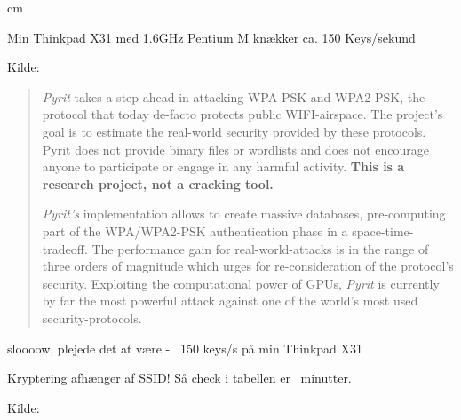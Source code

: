 \documentclass[Screen16to9,17pt]{foils}
\begin{document}
 cm

\centerline{Min Thinkpad X31 med 1.6GHz Pentium M knækker ca. 150 Keys/sekund}



Kilde: 


\begin{quote}
\emph{Pyrit} takes a step ahead in attacking WPA-PSK and WPA2-PSK, the protocol that today de-facto protects public WIFI-airspace. The project's goal is to estimate the real-world security provided by these protocols. Pyrit does not provide binary files or wordlists and does not encourage anyone to participate or engage in any harmful activity. {\bf This is a research project, not a cracking tool.}

\emph{Pyrit's} implementation allows to create massive databases, pre-computing part of the WPA/WPA2-PSK authentication phase in a space-time-tradeoff. The performance gain for real-world-attacks is in the range of three orders of magnitude which urges for re-consideration of the protocol's security. Exploiting the computational power of GPUs, \emph{Pyrit} is currently by far the most powerful attack against one of the world's most used security-protocols.
\end{quote}

\begin{list1}
\item sloooow, plejede det at være -  ~150 keys/s på min Thinkpad X31
\item Kryptering afhænger af SSID! Så check i tabellen er ~minutter.
\item {}
\end{list1}



Kilde: 


\end{document}
